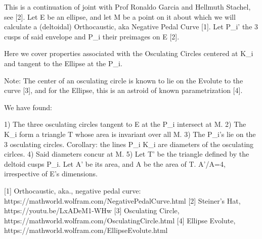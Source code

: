 This is a continuation of joint with Prof Ronaldo Garcia and Hellmuth Stachel, see [2]. Let E be an ellipse, and let M be a point on it about which we will calculate a (deltoidal) Orthocaustic, aka Negative Pedal Curve [1]. Let P_i' the 3 cusps of said envelope and P_i their preimages on E [2]. 

Here we cover properties associated with the Osculating Circles centered at K_i and tangent to the Ellipse at the P_i.

Note: The center of an osculating circle is known to lie on the Evolute to the curve [3], and for the Ellipse, this is an astroid of known parametrization [4]. 

We have found:

1) The three osculating circles tangent to E at the P_i intersect at M. 
2) The K_i form a triangle T whose area is invariant over all M. 
3) The P_i's lie on the 3 osculating circles. Corollary: the lines P_i K_i are diameters of the osculating cirlces.
4) Said diameters concur at M.
5) Let T' be the triangle defined by the deltoid cusps P_i. Let A' be its area, and A be the area of T. A'/A=4, irrespective of E's dimensions.

[1] Orthocaustic, aka., negative pedal curve: https://mathworld.wolfram.com/NegativePedalCurve.html
[2] Steiner's Hat, https://youtu.be/LxADeM1-WHw
[3] Osculating Circle, https://mathworld.wolfram.com/OsculatingCircle.html
[4] Ellipse Evolute, https://mathworld.wolfram.com/EllipseEvolute.html